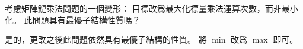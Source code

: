 \startEXERCISE
考慮矩陣鏈乘法問題的一個變形：
目標改爲最大化標量乘法運算次數，而非最小化。
此問題具有最優子結構性質嗎？
\stopEXERCISE

\startANSWER
是的，更改之後此問題依然具有最優子結構的性質。
將 $\min$ 改爲 $\max$ 即可。
\stopANSWER
